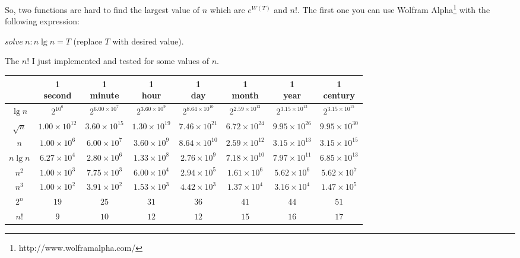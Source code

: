 \documentclass[11pt, oneside]{article}          %
\begin{document}
So, two functions are hard to find the largest value of $n$ which are $e^{W(T)}$ and $n!$. The first one you can use
Wolfram Alpha\footnote{http://www.wolframalpha.com/} with the following expression:

$solve\ n: n \lg n = T$ (replace $T$ with desired value).

The $n!$ I just implemented and tested for some values of $n$.

\begin{center}
  \begin{tabular}{ *{8}{c|} }
    & \shortstack{1 \\ second} & \shortstack{1 \\ minute} & \shortstack{1 \\ hour}%
      & \shortstack{1 \\ day} & \shortstack{1 \\ month} & \shortstack{1 \\ year}%
      & \shortstack{1 \\ century} \\ \hline

      $\lg n$   & $2^{10^6}$             & $2^{6.00 \times 10^7}$ & $2^{3.60 \times 10^9}$ & $2^{8.64 \times 10^{10}}$ & $2^{2.59 \times 10^{12}}$ & $2^{3.15 \times 10^{13}}$ & $2^{3.15 \times 10^{15}}$ \\
      $\sqrt n$ & $1.00 \times 10^{12}$  & $3.60 \times 10^{15}$  & $1.30 \times 10^{19}$  & $7.46 \times 10^{21}$  & $6.72 \times 10^{24}$     & $9.95 \times 10^{26}$     & $9.95 \times 10^{30}$ \\
      $n$       & $1.00 \times 10^6$     & $6.00 \times 10^7$     & $3.60 \times 10^9$     & $8.64 \times 10^{10}$  & $2.59 \times 10^{12}$     & $3.15 \times 10^{13}$     & $3.15 \times 10^{15}$ \\
      $n \lg n$ & $6.27 \times 10^4$     & $2.80 \times 10^6$     & $1.33 \times 10^8$     & $2.76 \times 10^9$     & $7.18 \times 10^{10}$     & $7.97 \times 10^{11}$     & $6.85 \times 10^{13}$ \\
      $n^2$     & $1.00 \times 10^3$     & $7.75 \times 10^3$     & $6.00 \times 10^4$     & $2.94 \times 10^5$     & $1.61 \times 10^6$        & $5.62 \times 10^6$        & $5.62 \times 10^7$ \\
      $n^3$     & $1.00 \times 10^2$     & $3.91 \times 10^2$     & $1.53 \times 10^3$     & $4.42 \times 10^3$     & $1.37 \times 10^4$        & $3.16 \times 10^4$        & $1.47 \times 10^5$ \\
      $2^n$     & $19$                   & $25$                   & $31$                   & $36$                   & $41$                      & $44$                      & $51$ \\
      $n!$      & $9$                    & $10$                   & $12$                   & $12$                   & $15$                      & $16$                      & $17$
    \end{tabular}
\end{center}
\end{document}
